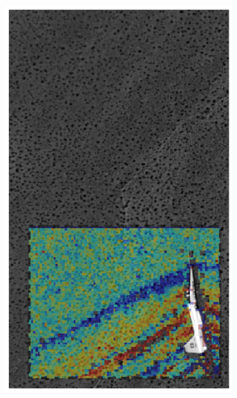 \documentclass[letterpaper,12pt]{article}
\begin{document}
\begin{figure}[h]
\begin{subfigure}[b]{0.3\textwidth}
        \includegraphics[width=0.95\textwidth]{AirBOS_Y_Displacement.PNG}
        \caption{}
        \label{fig:AirBOS_Y_Displacement}
    \end{subfigure}
    \begin{subfigure}[b]{0.3\textwidth}
    	\centering

\end{subfigure}
\end{figure}
\end{document}
